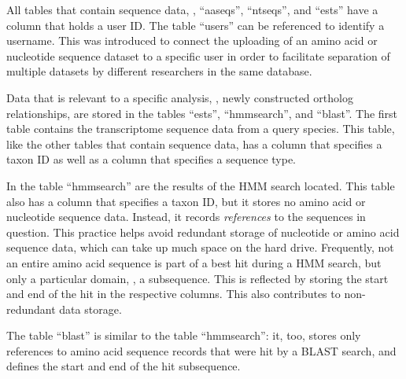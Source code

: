 All tables that contain sequence data, \ie, ``aaseqs'', ``ntseqs'', and
``ests'' have a column that holds a user ID. The table ``users'' can be
referenced to identify a username. This was introduced to connect the uploading
of an amino acid or nucleotide sequence dataset to a specific user in order to
facilitate separation of multiple datasets by different researchers in the same
database.



\clearpage

Data that is relevant to a specific analysis, \eg, newly constructed ortholog
relationships, are stored in the tables ``ests'', ``hmmsearch'', and ``blast''.
The first table contains the transcriptome sequence data from a query species.
This table, like the other tables that contain sequence data, has a column that
specifies a taxon ID as well as a column that specifies a sequence type.

In the table ``hmmsearch'' are the results of the HMM search located. This table
also has a column that specifies a taxon ID, but it stores no amino acid or
nucleotide sequence data. Instead, it records \emph{references} to the sequences
in question. This practice helps avoid redundant storage of nucleotide or amino
acid sequence data, which can take up much space on the hard drive. Frequently,
not an entire amino acid sequence is part of a best hit during a HMM search, but
only a particular domain, \ie, a subsequence. This is reflected by storing the
start and end of the hit in the respective columns. This also contributes to
non-redundant data storage. 

The table ``blast'' is similar to the table ``hmmsearch'': it, too, stores only
references to amino acid sequence records that were hit by a BLAST search, and
defines the start and end of the hit subsequence.




